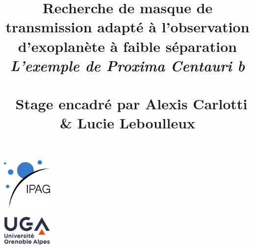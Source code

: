 \documentclass{article}
\date{}
\title{\vspace{10em}\textbf{Recherche de masque de transmission adapté à l'observation d'exoplanète à faible séparation} \\ \vspace{1.5em} \textsl{L'exemple de Proxima Centauri b} \vspace{5.5em} \\ \large{Stage encadré par Alexis Carlotti \& Lucie Leboulleux}}
\begin{document}
\maketitle
\vspace{5em}
\begin{center}
    \begin{minipage}{0.4\textwidth}
        \centering
        \includegraphics[width = 25mm]{figures/logo_ipag.jpg}
    \end{minipage}
    \begin{minipage}{0.4\textwidth}
        \centering    
        \includegraphics[width = 25mm]{figures/logo_uga.jpg}
    \end{minipage}
\end{center}
\thispagestyle{fancy}
\clearpage


%








\end{document}
